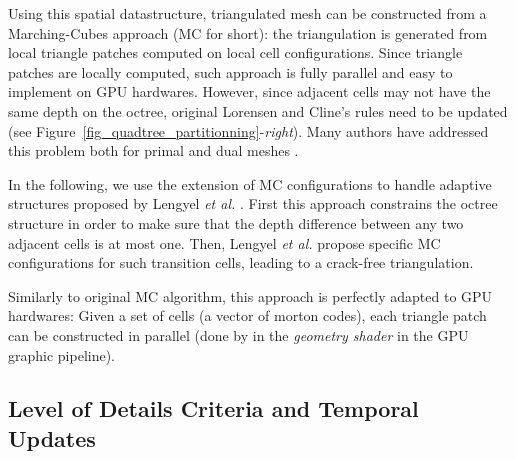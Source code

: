 \documentclass{llncs}
\begin{document}
Using this spatial datastructure, triangulated mesh can be constructed
from a Marching-Cubes approach \cite{lorensen1987marching} (MC for short): the
triangulation is generated from local triangle patches computed on
local cell configurations. Since triangle patches are locally
computed, such approach is fully parallel and easy to implement on GPU
hardwares. However, since adjacent cells may not have the same depth
on the octree, original Lorensen and Cline's rules need to be
updated (see Figure~\ref{fig_quadtree_partitionning}-\emph{right}). Many authors have addressed this problem both for primal and
dual meshes
\cite{shu1995adaptive,schaefer2004dual,lengyel2010voxel,DBLP:journals/cgf/LewinerMPPL10,DBLP:journals/cvgip/LobelloDD14}.

In the following, we use the extension of MC configurations to handle
adaptive structures proposed by Lengyel \emph{et al.}
\cite{lengyel2010voxel}. First this approach constrains the octree
structure in order to make sure that the depth difference between any
two adjacent cells is at most one. Then, Lengyel \emph{et al.} propose
specific MC configurations for such transition cells,  leading to a
crack-free triangulation.

Similarly to original MC algorithm, this approach is perfectly adapted
to GPU hardwares: Given a set of cells (a vector of morton codes),
each triangle patch can be constructed in parallel (done by
in the \emph{geometry shader} in the GPU graphic pipeline).

\subsection{Level of Details Criteria and Temporal Updates}
\end{document}
